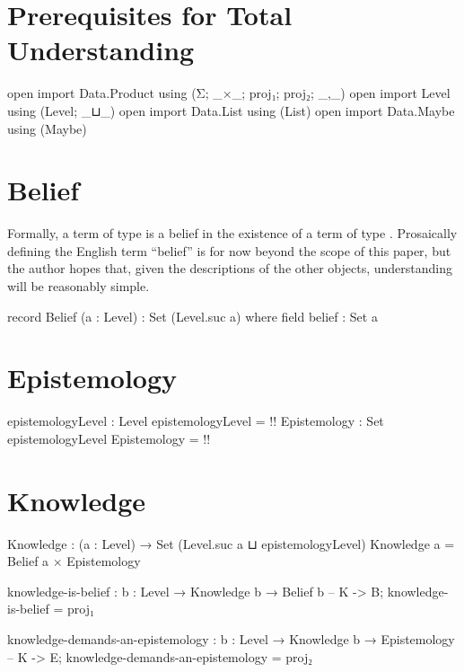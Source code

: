 \documentclass{article}
\begin{document}
\section{Prerequisites for Total Understanding}

\begin{code}
open import Data.Product using (Σ; _×_; proj₁; proj₂; _,_)
open import Level using (Level; _⊔_)
open import Data.List using (List)
open import Data.Maybe using (Maybe)
\end{code}

\section{Belief}
Formally, a term  of type   is a belief in the existence of a term of type  .  Prosaically defining the English term ``belief'' is for now beyond the scope of this paper, but the author hopes that, given the descriptions of the other objects, understanding  will be reasonably simple.

\begin{code}
record Belief (a : Level) : Set (Level.suc a) where
  field
    belief : Set a
\end{code}

\section{Epistemology}

\begin{code}
epistemologyLevel : Level
epistemologyLevel = {!!}
Epistemology : Set epistemologyLevel
Epistemology = {!!}
\end{code}

\section{Knowledge}

\begin{code}
Knowledge : (a : Level) → Set (Level.suc a ⊔ epistemologyLevel)
Knowledge a = Belief a × Epistemology
\end{code}

\begin{code}
knowledge-is-belief : {b : Level} → Knowledge b → Belief b -- K -> B;
knowledge-is-belief = proj₁
\end{code}

\begin{code}
knowledge-demands-an-epistemology :
  {b : Level} → Knowledge b → Epistemology -- K -> E;
knowledge-demands-an-epistemology = proj₂
\end{code}
\end{document}
